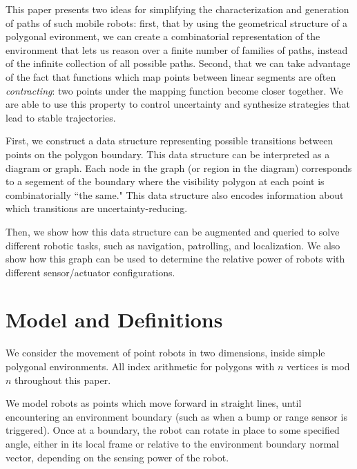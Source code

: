 \documentclass[]{svproc}  %
\begin{document}
This paper presents two ideas for simplifying the characterization and
generation of paths of such mobile robots: first, that by using the geometrical
structure of a polygonal evironment, we can create a combinatorial
representation of the environment that lets us reason over a finite number of
families of paths, instead of the infinite collection of all possible paths.
Second, that we can take advantage of the fact that functions which map points
between linear segments are often \emph{contracting}: two points under the
mapping function become closer together. We are able to use this property to
control uncertainty and synthesize strategies that lead to stable trajectories.

First, we construct a data structure representing possible transitions between points on
the polygon boundary. This data structure can be interpreted as a diagram or graph. 
Each node in the graph (or region in the diagram) corresponds to a segement of the
boundary where the visibility polygon at each point is combinatorially ``the
same." This data structure also encodes information about which transitions are 
uncertainty-reducing.

Then, we show how this data structure can be augmented and queried to solve different
robotic tasks, such as navigation, patrolling, and localization. We also show how this graph can be used to determine the
relative power of robots with different sensor/actuator configurations.




\section{Model and Definitions}

We consider the movement of point robots in two dimensions, inside simple polygonal
environments. All index arithmetic for polygons with $n$ vertices is mod $n$ 
throughout this paper.

We model robots as points which move forward in straight lines, until encountering 
an environment boundary (such as when a bump or range
sensor is triggered). Once at a boundary, the robot can rotate in place to some
specified angle, either in its local frame or relative to the environment
boundary normal vector, depending on the sensing power of the robot.
\end{document}

